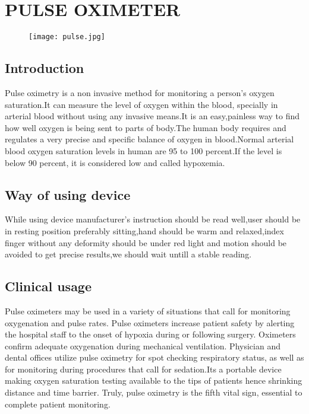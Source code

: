 \documentclass[12pt]{article}
\date{}
\begin{document}
\tableofcontents
\clearpage

\section{PULSE OXIMETER}

\begin{figure}
\centering
\texttt{[image: pulse.jpg]}
\end{figure}
\subsection{Introduction}

Pulse oximetry is a non invasive method for monitoring a person's oxygen saturation.It can measure the level of oxygen within the blood, specially in arterial blood without using any invasive means.It is an easy,painless way to find how well oxygen is being sent to parts of body.The human body requires and regulates a very precise and specific balance of oxygen in blood.Normal arterial blood oxygen saturation levels in human are 95 to 100 percent.If the level is below 90 percent, it is considered low and called hypoxemia.\\
\subsection{Way of using device}
While using device manufacturer's instruction should be read well,user should be in resting position preferably sitting,hand should be warm and relaxed,index finger without any deformity should be under red light and motion should be avoided to get precise results,we should wait untill a stable reading.
\subsection{Clinical usage}
Pulse oximeters may be used in a variety of situations that call for monitoring oxygenation and
pulse rates. Pulse oximeters increase patient safety by alerting the hospital staff to the onset of
hypoxia during or following surgery. Oximeters confirm adequate oxygenation during
mechanical ventilation. Physician and dental offices utilize pulse oximetry for spot checking
respiratory status, as well as for monitoring during procedures that call for sedation.Its a portable device making oxygen saturation testing available to the tips of patients hence shrinking distance and time barrier.  Truly, pulse
oximetry is the fifth vital sign, essential to complete patient monitoring.
\end{document}
